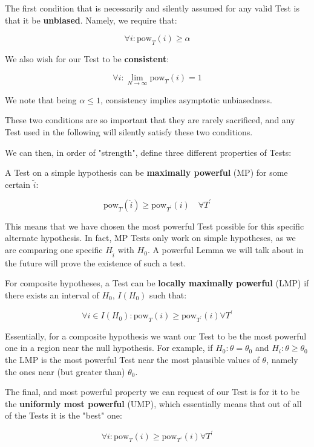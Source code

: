 The first condition that is necessarily and silently assumed for any valid Test is that it be \textbf{unbiased}. Namely, we require that:

	\[
	\forall i: \text{pow}_T(i) \geq \alpha
	\tag{Unbiasedness condition}
	\]

We also wish for our Test to be \textbf{consistent}:

	\[
	\forall i: \lim_{N \to \infty}\text{pow}_T(i) = 1
	\tag{Consistency condition}
	\]

We note that being $\alpha\leq1$, consistency implies asymptotic unbiasedness. 

These two conditions are so important that they are rarely sacrificed, and any Test used in the following will silently satisfy these two conditions.

We can then, in order of "strength", define three different properties of Tests:

A Test on a simple hypothesis can be \textbf{maximally powerful} (MP) for some certain $\tilde{i}$:

	\[
	\text{pow}_T(\hat{i})\geq\text{pow}_{T^\prime}(i)\quad \forall T^\prime
	\tag{MP Test}
	\]

This means that we have chosen the most powerful Test possible for this specific alternate hypothesis. In fact, MP Tests only work on simple hypotheses, as we are comparing one specific $H_{\hat{i}}$ with $H_0$. A powerful Lemma we will talk about in the future will prove the existence of such a test. 

For composite hypotheses, a Test can be \textbf{locally maximally powerful} (LMP) if there exists an interval of $H_0$, $I(H_0)$ such that:


	\[
	\forall i\in I(H_0): \text{pow}_T(i) \geq \text{pow}_{T^\prime}(i) \forall T^\prime
	\tag{LMP Test}
	\]

Essentially, for a composite hypothesis we want our Test to be the most powerful one in a region near the null hypothesis. For example, if $H_0: \theta= \theta_0$ and $H_i: \theta\geq\theta_0$ the LMP is the most powerful Test near the most plausible values of $\theta$, namely the ones near (but greater than) $\theta_0$.

The final, and most powerful property we can request of our Test is for it to be the \textbf{uniformly most powerful} (UMP), which essentially means that out of all of the Tests it is the "best" one:

	\[
	\forall i: \text{pow}_T(i) \geq \text{pow}_{T^\prime}(i) \forall T^\prime
	\tag{UMP Test}
	\]

